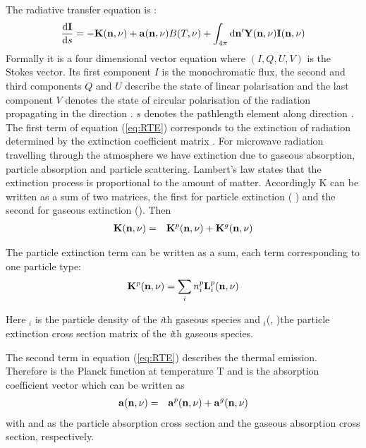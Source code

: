 \newcommand{\DirFre} {(\PDir, \Frq)}



\label{sec:scattering:general_rte}
 

The radiative transfer equation is \citep{mishchenko00:_light_scatt_nonsp_partic}: 
\begin{eqnarray}
     \frac{\DiffD \StoVec}{\DiffD s} =
     -\ExtMat\DirFre+\AbsVec\DirFre \Planck(\Tmp, \Frq)
     +\int_{4\pi} \DiffD \PDir' \SEfMat\DirFre \StoVec\DirFre 
     \label{eq:RTE} 
\end{eqnarray} 
Formally it is a four dimensional vector equation where \StoVec
$(I,Q,U,V)$ is the Stokes vector.
Its first component $I$ is the monochromatic flux, the
second and third components $Q$ and $U$ describe the state of linear
polarisation and the last component $V$ denotes the state of circular
polarisation of the radiation propagating in the direction \PDir.
\DiffD $s$ denotes the pathlength element along direction \PDir.
\\

The first term of equation (\ref{eq:RTE}) corresponds to the extinction of
radiation determined by the extinction coefficient matrix \ExtMat
. For microwave radiation travelling through the atmosphere we
have extinction due to gaseous
absorption, particle absorption and  particle scattering. Lambert's law
states that the extinction process is
proportional to the amount of matter. Accordingly K can be written as
a sum of two matrices, the first for particle extinction ( )
and the second for gaseous extinction (). Then
\begin{eqnarray}
  \ExtMat\DirFre &=&
  \aExtMat{p}\DirFre+\aExtMat{g}\DirFre
\end{eqnarray}

The particle extinction term can be written as a sum, each term
corresponding to one particle type:
\begin{eqnarray}
  \aExtMat{p}\DirFre = \sum_i \PDen_i \aSExMat{p}_i \DirFre
\end{eqnarray}

Here \PDen$_i$ is the particle density of the
{\sl i}th gaseous species and  $_i$\DirFre  the particle
extinction cross section matrix of the
{\sl i}th gaseous species.

The second term in equation (\ref{eq:RTE})  describes the thermal
emission. Therefore \Planck  is the Planck
function at temperature T and \AbsVec  is the absorption
coefficient vector which can be written as
 \begin{eqnarray}
  \AbsVec \DirFre  &=& \aAbsVec{p} \DirFre + \aAbsVec{g} \DirFre 
  \end{eqnarray}
with  and  as the particle
absorption 
cross section
and the gaseous absorption cross section, respectively. 

